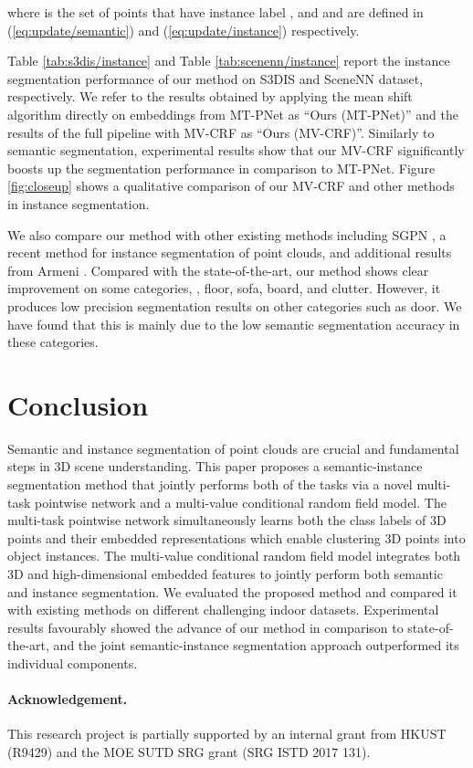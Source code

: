 \documentclass[10pt,twocolumn,letterpaper]{article}
\begin{document}
where  is the set of points that have instance label , and  and
 are defined in (\ref{eq:update/semantic}) and (\ref{eq:update/instance})
respectively.

Table \ref{tab:s3dis/instance} and Table \ref{tab:scenenn/instance} report the
instance segmentation performance of our method on S3DIS and SceneNN dataset,
respectively. We refer to the results obtained by applying the mean shift
algorithm directly on embeddings from MT-PNet as ``Ours (MT-PNet)'' and the
results of the full pipeline with MV-CRF as ``Ours (MV-CRF)''. Similarly to
semantic segmentation, experimental results show that our MV-CRF significantly
boosts up the segmentation performance in comparison to MT-PNet. Figure
\ref{fig:closeup} shows a qualitative comparison of our MV-CRF and other methods
in instance segmentation.

We also compare our method with other existing methods including SGPN
\cite{wang-sgpn-cvpr18}, a recent method for instance segmentation of point
clouds, and additional results from Armeni \etal \cite{armeni-s3dis-cvpr16}.
Compared with the state-of-the-art, our method shows clear improvement on some
categories, \eg, floor, sofa, board, and clutter. However, it produces low
precision segmentation results on other categories such as door. We have found
that this is mainly due to the low semantic segmentation accuracy in these
categories.
 \section{Conclusion}
\label{sec:remark}

Semantic and instance segmentation of point clouds are crucial and fundamental
steps in 3D scene understanding. This paper proposes a semantic-instance
segmentation method that jointly performs both of the tasks via a novel
multi-task pointwise network and a multi-value conditional random field
model. The multi-task pointwise network simultaneously learns both the class
labels of 3D points and their embedded representations which enable clustering
3D points into object instances. The multi-value conditional random field model
integrates both 3D and high-dimensional embedded features to jointly perform
both semantic and instance segmentation. We evaluated the proposed method and
compared it with existing methods on different challenging indoor
datasets. Experimental results favourably showed the advance of our method in
comparison to state-of-the-art, and the joint semantic-instance segmentation
approach outperformed its individual components.

\paragraph{Acknowledgement.} This research project is partially supported by an
internal grant from HKUST (R9429) and the MOE SUTD SRG grant (SRG ISTD 2017
131).
 
{\small
  
  
}
\end{document}
